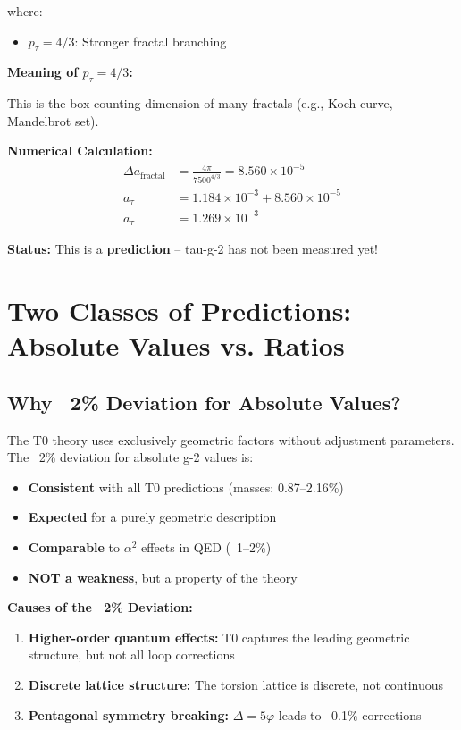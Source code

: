 	where:
	\begin{itemize}
		\item $p_\tau = 4/3$: Stronger fractal branching
	\end{itemize}
	
	\textbf{Meaning of $p_\tau = 4/3$:}
	
	This is the box-counting dimension of many fractals (e.g., Koch curve, Mandelbrot set).
	
	\textbf{Numerical Calculation:}
	\begin{align}
		\Delta a_{\text{fractal}} &= \frac{4\pi}{7500^{4/3}} = 8.560 \times 10^{-5} \\
		a_\tau &= 1.184 \times 10^{-3} + 8.560 \times 10^{-5} \\
		a_\tau &= 1.269 \times 10^{-3}
	\end{align}
	
	\textbf{Status:} This is a \textbf{prediction} – tau-g-2 has not been measured yet!
	
	\section{Two Classes of Predictions: Absolute Values vs. Ratios}
	
	\subsection{Why ~2\% Deviation for Absolute Values?}
	
	The T0 theory uses exclusively geometric factors without adjustment parameters. The ~2\% deviation for absolute g-2 values is:
	
	\begin{itemize}
		\item \textbf{Consistent} with all T0 predictions (masses: 0.87--2.16\%)
		\item \textbf{Expected} for a purely geometric description
		\item \textbf{Comparable} to $\alpha^2$ effects in QED (~1--2\%)
		\item \textbf{NOT a weakness}, but a property of the theory
	\end{itemize}
	
	\textbf{Causes of the ~2\% Deviation:}
	\begin{enumerate}
		\item \textbf{Higher-order quantum effects:} T0 captures the leading geometric structure, but not all loop corrections
		\item \textbf{Discrete lattice structure:} The torsion lattice is discrete, not continuous
		\item \textbf{Pentagonal symmetry breaking:} $\Delta = 5\varphi$ leads to ~0.1\% corrections
	\end{enumerate}
	
